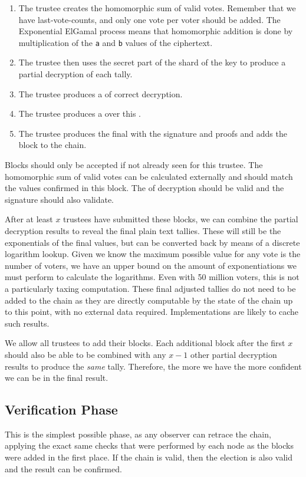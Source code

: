 \begin{enumerate}
    \item The trustee creates the homomorphic sum of valid votes. Remember that we have last-vote-counts, and only one vote per voter should be added. The Exponential ElGamal process means that homomorphic addition is done by multiplication of the \texttt{a} and \texttt{b} values of the ciphertext.
    \item The trustee then uses the secret part of the shard of the key to produce a partial decryption of each tally.
    \item The trustee produces a  of correct decryption.
    \item The trustee produces a  over this .
    \item The trustee produces the final  with the signature and proofs and adds the block to the chain.
\end{enumerate}

Blocks should only be accepted if not already seen for this trustee. The homomorphic sum of valid votes can be calculated externally and should match the values confirmed in this block. The  of decryption should be valid and the signature should also validate.

After at least $x$ trustees have submitted these blocks, we can combine the partial decryption results to reveal the final plain text tallies. These will still be the exponentials of the final values, but can be converted back by means of a discrete logarithm lookup. Given we know the maximum possible value for any vote is the number of voters, we have an upper bound on the amount of exponentiations we must perform to calculate the logarithms. Even with 50 million voters, this is not a particularly taxing computation. These final adjusted tallies do not need to be added to the chain as they are directly computable by the state of the chain up to this point, with no external data required. Implementations are likely to cache such results.

We allow all trustees to add their blocks. Each additional block after the first $x$ should also be able to be combined with any $x - 1$ other partial decryption results to produce the \emph{same} tally. Therefore, the more we have the more confident we can be in the final result.

\subsection{Verification Phase}
\label{ch:astris:detail:verify}

This is the simplest possible phase, as any observer can retrace the chain, applying the exact same checks that were performed by each node as the blocks were added in the first place. If the chain is valid, then the election is also valid and the result can be confirmed.
